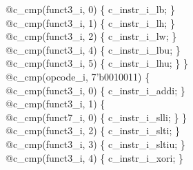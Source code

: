 {\indent \hspace{\parindent} \hspace{\parindent} @c\_cmp(funct3\_i, 0) \{ c\_instr\_i\_lb; \}\\%
\indent \hspace{\parindent} \hspace{\parindent} @c\_cmp(funct3\_i, 1) \{ c\_instr\_i\_lh; \}\\%
\indent \hspace{\parindent} \hspace{\parindent} @c\_cmp(funct3\_i, 2) \{ c\_instr\_i\_lw; \}\\%
\indent \hspace{\parindent} \hspace{\parindent} @c\_cmp(funct3\_i, 4) \{ c\_instr\_i\_lbu; \}\\%
\indent \hspace{\parindent} \hspace{\parindent} @c\_cmp(funct3\_i, 5) \{ c\_instr\_i\_lhu; \} \}\\%
\indent \hspace{\parindent} @c\_cmp(opcode\_i, 7'b0010011) \{\\%
\indent \hspace{\parindent} \hspace{\parindent} @c\_cmp(funct3\_i, 0) \{ c\_instr\_i\_addi; \}\\%
\indent \hspace{\parindent} \hspace{\parindent} @c\_cmp(funct3\_i, 1) \{ \\%
\indent \hspace{\parindent} \hspace{\parindent} \hspace{\parindent} @c\_cmp(funct7\_i, 0) \{ c\_instr\_i\_slli; \} \}\\%
\indent \hspace{\parindent} \hspace{\parindent} @c\_cmp(funct3\_i, 2) \{ c\_instr\_i\_slti; \}\\%
\indent \hspace{\parindent} \hspace{\parindent} @c\_cmp(funct3\_i, 3) \{ c\_instr\_i\_sltiu; \}\\%
\indent \hspace{\parindent} \hspace{\parindent} @c\_cmp(funct3\_i, 4) \{ c\_instr\_i\_xori; \}\\%
}
